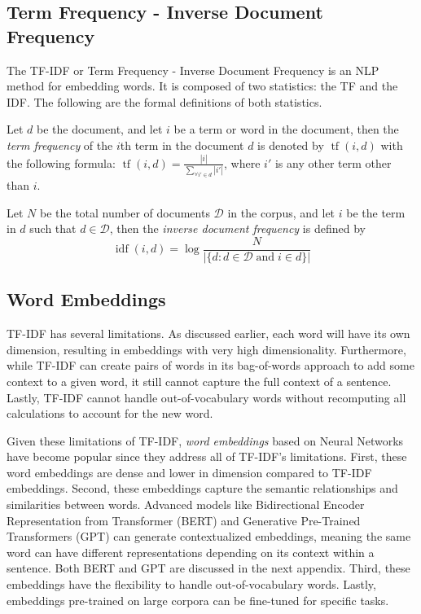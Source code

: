 \subsection{Term Frequency - Inverse Document Frequency}\label{sec:tf-idf}
The TF-IDF or Term Frequency - Inverse Document Frequency is an NLP method for embedding words. It is composed of two statistics: the TF and the IDF. The following are the formal definitions of both statistics.

\begin{defnx}
Let $d$ be the document, and let $i$ be a term or word in the document, then the \textit{term frequency} of the $i$th term in the document $d$ is denoted by $\operatorname{tf}(i,d)$ with the following formula: $\operatorname{tf}(i,d)=\displaystyle\frac{|i|}{\sum_{\forall i'\in d}|i'|}$, where $i'$ is any other term other than $i$.
\end{defnx}

\begin{defnx}
Let $N$ be the total number of documents $\mathscr{D}$ in the corpus, and let $i$ be the term in $d$ such that $d\in \mathscr{D}$, then the \textit{inverse document frequency} is defined by
\begin{equation}
    \operatorname{idf}(i,d)=\log\frac{N}{|\{d:d\in \mathscr{D}\;\text{and}\;i\in d\}|}
\end{equation}
\end{defnx}

\subsection{Word Embeddings}\label{sec:word-embeddings}
TF-IDF has several limitations. As discussed earlier, each word will have its own dimension, resulting in embeddings with very high dimensionality. Furthermore, while TF-IDF can create pairs of words in its bag-of-words approach to add some context to a given word, it still cannot capture the full context of a sentence. Lastly, TF-IDF cannot handle out-of-vocabulary words without recomputing all calculations to account for the new word.

Given these limitations of TF-IDF, \textit{word embeddings} based on Neural Networks have become popular since they address all of TF-IDF's limitations. First, these word embeddings are dense and lower in dimension compared to TF-IDF embeddings. Second, these embeddings capture the semantic relationships and similarities between words. Advanced models like Bidirectional Encoder Representation from Transformer (BERT) and Generative Pre-Trained Transformers (GPT) can generate contextualized embeddings, meaning the same word can have different representations depending on its context within a sentence. Both BERT and GPT are discussed in the next appendix. Third, these embeddings have the flexibility to handle out-of-vocabulary words. Lastly, embeddings pre-trained on large corpora can be fine-tuned for specific tasks.

